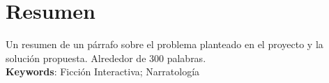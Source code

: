 
\chapter*{Resumen}

Un resumen de un párrafo sobre el problema planteado en el proyecto y la solución propuesta. Alrededor de 300 palabras.
\\

\textbf{Keywords}: Ficción Interactiva; Narratología
